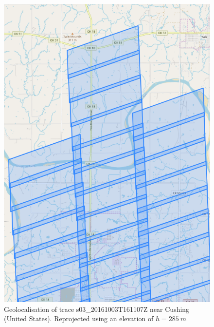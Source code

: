 \documentclass[paper=a4, fontsize=11pt, onecolumn, tikz, dvipsnames, svgnames, x11names]{article}
\begin{document}
\begin{figure}[H]
    \centering
    \includegraphics[height = 0.7\textheight]{trace_7Z.png}
    \caption{Geolocalisation of trace s03\_20161003T161107Z near Cushing (United States). Reprojected using an elevation of $h=285~m$}
    \label{fig_trace_7Z}
\end{figure}
\end{document}
